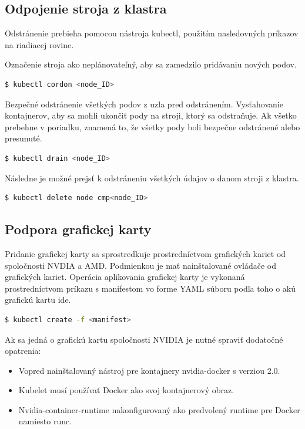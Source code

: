 \subsection{Odpojenie stroja z klastra}

Odstránenie prebieha pomocou nástroja kubectl, použitím nasledovných príkazov na riadiacej rovine.

Označenie stroja ako neplánovateľný, aby sa zamedzilo pridávaniu nových podov.

\begin{lstlisting}[language=Bash]
    $ kubectl cordon <node_ID>
    \end{lstlisting}

Bezpečné odstránenie všetkých podov z uzla pred odstránením. Vysťahovanie kontajnerov, aby sa mohli ukončiť pody na stroji, ktorý sa odstraňuje. Ak všetko prebehne v poriadku, znamená to, že všetky pody boli bezpečne odstránené alebo presunuté.

\begin{lstlisting}[language=Bash]
    $ kubectl drain <node_ID>
    \end{lstlisting}

Následne je možné prejsť k odstráneniu všetkých údajov o danom stroji z klastra.

\begin{lstlisting}[language=Bash]
    $ kubectl delete node cmp<node_ID>
    \end{lstlisting}

\subsection{Podpora grafickej karty}

Pridanie grafickej karty sa sprostredkuje prostredníctvom grafických kariet od spoločnosti NVDIA a AMD. Podmienkou je mať nainštalované ovládače od grafických kariet.
Operácia aplikovania grafickej karty je vykonaná prostredníctvom príkazu s manifestom vo forme YAML súboru podľa toho o akú grafickú kartu ide.

\begin{lstlisting}[language=Bash]
    $ kubectl create -f <manifest>
    \end{lstlisting}

Ak sa jedná o grafickú kartu spoločnosti NVIDIA je nutné spraviť dodatočné opatrenia:

\begin{itemize}
    \item Vopred nainštalovaný nástroj pre kontajnery nvidia-docker s verziou 2.0.
    \item Kubelet musí používať Docker ako svoj kontajnerový obraz.
    \item Nvidia-container-runtime nakonfigurovaný ako predvolený runtime pre Docker namiesto runc.
\end{itemize}

